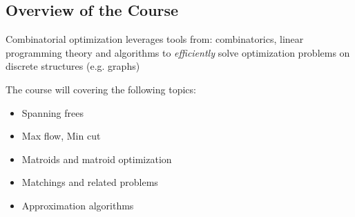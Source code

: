 \subsection{Overview of the Course}
Combinatorial optimization leverages tools from: combinatorics, linear programming theory and algorithms to \textit{efficiently} solve optimization problems on discrete structures (e.g. graphs)

The course will covering the following topics:
\begin{itemize}
    \item Spanning frees
    \item Max flow, Min cut
    \item Matroids and matroid optimization
    \item Matchings and related problems
    \item Approximation algorithms
\end{itemize}
